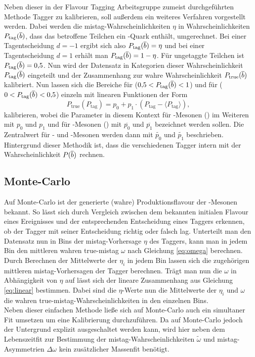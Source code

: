 Neben dieser in der Flavour Tagging Arbeitsgruppe zumeist durchgeführten Methode Tagger zu kalibrieren, soll außerdem ein weiteres Verfahren vorgestellt werden. Dabei werden die mistag-Wahrscheinlichkeiten $\eta$ in Wahrscheinlichkeiten $P_\text{tag}({\overline {{b}}})$, dass das betroffene Teilchen ein \bquarkbar-Quark enthält, umgerechnet. Bei einer Tagentscheidung $d=-1$ ergibt sich also $P_\text{tag}({\overline {{b}}})=\eta$ und bei einer Tagentscheidung $d=1$ erhält man $P_\text{tag}({\overline {{b}}})=1-\eta$. Für ungetaggte Teilchen ist $P_\text{tag}({\overline {{b}}})=0{,}5$. Nun wird der Datensatz in Kategorien dieser Wahrscheinlichkeit $P_\text{tag}({\overline {{b}}})$ eingeteilt und der Zusammenhang zur wahre Wahrscheinlichkeit $P_\text{true}({\overline {{b}}})$ kalibriert. Nun lassen sich die Bereiche für \bquarkbar ($0{,}5<P_\text{tag}({\overline {{b}}})<1$) und für \bquark ($0<P_\text{tag}({\overline {{b}}})<0{,}5$) einzeln mit linearen Funktionen der Form
\begin{equation}
P_\text{true}(P_\text{tag})=p_0+p_1\cdot\left(P_\text{tag}-\langle P_\text{tag}\rangle\right)\label{eq:linearPB},
\end{equation}
kalibrieren, wobei die Parameter in diesem Kontext für \Bz-Mesonen (\bquarkbar\dquark) im Weiteren mit $p_0$ und $p_1$ und für \Bzb-Mesonen (\bquark\dquarkbar) mit $\overline{p_0}$ und $\overline{p_1}$ bezeichnet werden sollen. Die Zentralwert für \Bz- und \Bzb-Mesonen werden dann mit $\widetilde{p_0}$ und $\widetilde{p_1}$ beschrieben.\\
Hintergrund dieser Methodik ist, dass die verschiedenen Tagger intern mit der Wahrscheinlichkeit $P({\overline {{b}}})$ rechnen.

\subsection{Monte-Carlo}\label{sec:mckalibrierung}

Auf Monte-Carlo ist der generierte (wahre) Produktionsflavour der \B-Mesonen bekannt. So lässt sich durch Vergleich zwischen dem bekannten initialen Flavour eines Ereignisses und der entsprechenden Entscheidung eines Taggers erkennen, ob der Tagger mit seiner Entscheidung richtig oder falsch lag. Unterteilt man den Datensatz nun in Bins der mistag-Vorhersage $\eta$ des Taggers, kann man in jedem Bin den mittleren wahren true-mistag $\omega$ nach Gleichung \eqref{eq:omega} berechnen. Durch Berechnen der Mittelwerte der $\eta_i$ in jedem Bin lassen sich die zugehörigen mittleren mistag-Vorhersagen der Tagger berechnen. Trägt man nun die $\omega$ in Abhängigkeit von $\eta$ auf lässt sich der lineare Zusammenhang aus Gleichung \eqref{eq:linear} bestimmen. Dabei sind die $\eta$-Werte nun die Mittelwerte der $\eta_i$ und $\omega$ die wahren true-mistag-Wahrscheinlichkeiten in den einzelnen Bins.\\
Neben dieser einfachen Methode ließe sich auf Monte-Carlo auch ein simultaner Fit umsetzen um eine Kalibrierung durchzuführen. Da auf Monte-Carlo jedoch der Untergrund explizit ausgeschaltet werden kann, wird hier neben dem Lebenszeitfit zur Bestimmung der mistag-Wahrscheinlichkeiten $\widetilde{\omega}$  und mistag-Asymmetrien $\Delta\omega$ kein zusätzlicher Massenfit benötigt.


